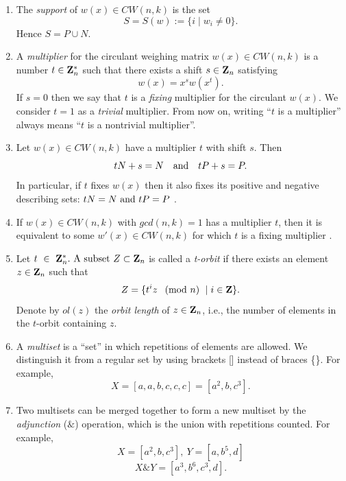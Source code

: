 {\begin{enumerate}
     \item The {\it support} of $ w(x) \in CW(n,k)$ is the set
	$$ S=S(w):=\{i \mid w_{i} \neq 0\}.$$
	Hence $ S=P \cup N $. 
     
     \item \label{multip}
	A {\it multiplier} for the  circulant weighing matrix 
	$ w(x) \in CW(n,k) $ is a number $t \in {\bf Z}^{*}_{n}$ 
	such that there exists a shift $ s \in {\bf Z}_{n} $ satisfying  
	$$ w(x)=x^{s}w(x^{t}).$$ 
	If $s=0$ then we say that $t$ is a {\it fixing} multiplier  
	for the circulant $w(x)$. 
	We consider $t=1$ as a {\it trivial} multiplier. From now on, writing 
	``$t$ is a multiplier'' always means ``$t$ is a nontrivial multiplier''.

     
     \item \label{str2}
	  Let $w(x) \in CW(n,k)$ have a multiplier $t$ with shift $s$. Then
	$$ tN+s=N \quad {\rm and} \quad tP+s=P. $$
	  In particular, if $t$ fixes $w(x)$ then it also fixes its positive and 
	  negative describing sets: $ tN=N \ {\rm and } \ tP=P$ \cite{str}.

     \item \label{str4}
	 If $w(x) \in CW(n,k)$ with $gcd(n,k)=1$ has a multiplier $t$, then it is 
	 equivalent to some $w'(x) \in CW(n,k)$ for which $t$ is a fixing 
	 multiplier \cite{str}.

     \item Let $ t~\in~{\bf Z}^{*}_{n}. \ {\rm A \ subset} \ Z \subset {\bf Z}_{n} $ 
	is called a {\it t-orbit} if there exists an element 
	$ z \in {\bf Z}_{n} $ such that 
	$$ Z=\{ t^{i}z~\pmod{n}~\mid i \in \bf Z\} .$$
	Denote by $ol(z)$ the {\it orbit length} of $z\in{\bf Z}_{n}$, i.e., the number 
	of elements in the $t$-orbit containing $z$.
 
    
    \item A {\it multiset} is a ``set'' in which repetitions of elements are 
	allowed. We distinguish it from a regular set by using brackets [] instead of braces \{\}. 
	For example, 
	$$X=[a,a,b,c,c,c]=[a^2,b,c^3].$$
    
    \item Two multisets can be merged together to form a new multiset by the 
	{\it adjunction} ($\&$) operation, which is the union with repetitions 
	counted. 
	For example,
	   $$X=[a^2,b,c^3], \ Y=[a,b^5,d]$$
	   $$X \& Y=[a^3,b^6,c^3,d].$$


\end{enumerate}}
